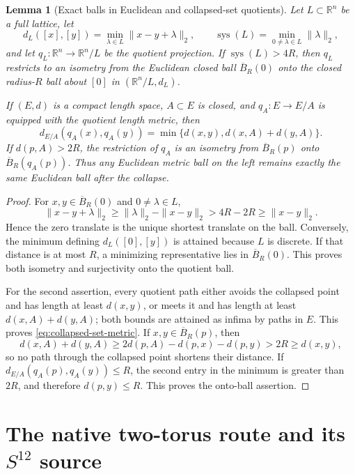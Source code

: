 \documentclass[11pt,letterpaper]{article}
\numberwithin{equation}{section}
\newtheorem{lemma}[theorem]{Lemma}
\theoremstyle{definition}
\theoremstyle{remark}
\newcommand{\R}{\mathbb R}
\newcommand{\sys}{\operatorname{sys}}
\begin{document}
\begin{lemma}[Exact balls in Euclidean and collapsed-set quotients]
\label{lem:exact-quotient-balls}
Let \(L\subset\R^n\) be a full lattice, let
\[
 d_L([x],[y])=\min_{\lambda\in L}\|x-y+\lambda\|_2,
 \qquad
 \sys(L)=\min_{0\ne\lambda\in L}\|\lambda\|_2,
\]
and let \(q_L:\R^n\to\R^n/L\) be the quotient projection.  If
\(\sys(L)>4R\), then \(q_L\) restricts to an isometry from the Euclidean
closed ball \(\overline B_R(0)\) \emph{onto} the closed radius-\(R\) ball
about \([0]\) in \((\R^n/L,d_L)\).

If \((E,d)\) is a compact length space, \(A\subset E\) is closed, and
\(q_A:E\to E/A\) is equipped with the quotient length metric, then
\begin{equation}
 d_{E/A}(q_A(x),q_A(y))
 =\min\{d(x,y),d(x,A)+d(y,A)\}.
 \label{eq:collapsed-set-metric}
\end{equation}
If \(d(p,A)>2R\), the restriction of \(q_A\) is an isometry from
\(\overline B_R(p)\) onto \(\overline B_R(q_A(p))\).  Thus any Euclidean
metric ball on the left remains exactly the same Euclidean ball after the
collapse.
\end{lemma}

\begin{proof}
For \(x,y\in\overline B_R(0)\) and \(0\ne\lambda\in L\),
\[
 \|x-y+\lambda\|_2
 \geq\|\lambda\|_2-\|x-y\|_2
 >4R-2R\geq\|x-y\|_2.
\]
Hence the zero translate is the unique shortest translate on the ball.
Conversely, the minimum defining \(d_L([0],[y])\) is attained because
\(L\) is discrete.  If that distance is at most \(R\), a minimizing
representative lies in \(\overline B_R(0)\).  This proves both isometry and
surjectivity onto the quotient ball.

For the second assertion, every quotient path either avoids the collapsed
point and has length at least \(d(x,y)\), or meets it and has length at
least \(d(x,A)+d(y,A)\); both bounds are attained as infima by paths in
\(E\).  This proves \cref{eq:collapsed-set-metric}.  If
\(x,y\in\overline B_R(p)\), then
\[
 d(x,A)+d(y,A)
 \geq2d(p,A)-d(p,x)-d(p,y)>2R\geq d(x,y),
\]
so no path through the collapsed point shortens their distance.  If
\(d_{E/A}(q_A(p),q_A(y))\leq R\), the second entry in the minimum is
greater than \(2R\), and therefore \(d(p,y)\leq R\).  This proves the
onto-ball assertion.
\end{proof}

\section{The native two-torus route and its
\texorpdfstring{$S^{12}$}{S12} source}
\end{document}
